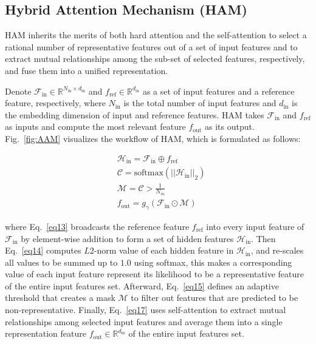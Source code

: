 \documentclass[letterpaper]{article} \usepackage{aaai23}  \usepackage{times}  \usepackage{helvet}  \usepackage{courier}  \usepackage[hyphens]{url}  \usepackage{graphicx} \urlstyle{rm} \def\UrlFont{\rm}  \usepackage{natbib}  \usepackage{caption} \frenchspacing  \setlength{\pdfpagewidth}{8.5in}  \setlength{\pdfpageheight}{11in}  \usepackage{algorithm}
\begin{document}
\subsection{Hybrid Attention Mechanism (HAM)}
\label{sec:aam}

HAM inherits the merits of both hard attention \cite{patro2018differential} and the self-attention \cite{vaswani2017attention} to select a rational number of representative features out of a set of input features and to extract mutual relationships among the sub-set of selected features, respectively, and fuse them into a unified representation.


Denote $\mathcal{F}_{\text{in}} \in \mathbb{R}^{N_{\text{in}} \times d_{\text{in}}}$ and $f_{\text{ref}} \in \mathbb{R}^{d_{\text{in}}}$ as a set of input features and a reference feature, respectively, where $N_{\text{in}}$ is the total number of input features and $d_{\text{in}}$ is the embedding dimension of input and reference features. HAM takes $\mathcal{F}_{\text{in}}$ and $f_{\text{ref}}$ as inputs and compute the most relevant feature $f_{\text{out}}$ as its output. Fig.~\ref{fig:AAM} visualizes the workflow of HAM, which is formulated as follows: 

\vspace{-1mm}
\begin{subequations}
\begin{align}
&\mathcal{H}_{\text{in}}=\mathcal{F}_{\text{in}} \oplus f_{\text{ref}}\label{eq13}\\
&\mathcal{C}=\text{softmax}(||\mathcal{H}_{\text{in}}||_2)\label{eq14}\\
&\mathcal{M} = \mathcal{C} > \frac{1}{N_{in}}\label{eq15}\\
&f_{\text{out}} = g_\gamma(\mathcal{F}_{\text{in}} \odot \mathcal{M})\label{eq17}
\end{align}
\end{subequations}




where Eq.~\ref{eq13} broadcasts the reference feature $f_{\text{ref}}$ into every input feature of $\mathcal{F}_{\text{in}}$ by element-wise addition to form a set of hidden features $\mathcal{H}_{\text{in}}$. Then Eq.~\ref{eq14} computes $L2$-norm value of each hidden feature in $\mathcal{H}_{\text{in}}$, and re-scales all values to be summed up to $1.0$ using softmax, this makes a corresponding value of each input feature represent its likelihood to be a representative feature of the entire input features set. Afterward, Eq.~\ref{eq15} defines an adaptive threshold that 
creates a mask $\mathcal{M}$ to 
filter out features that are predicted to be non-representative. Finally, Eq.~\ref{eq17} uses self-attention to extract mutual relationships among selected input features and average them into a single representation feature $f_{\text{out}} \in \mathbb{R}^{d_{\text{in}}}$ of the entire input features set.
\end{document}
